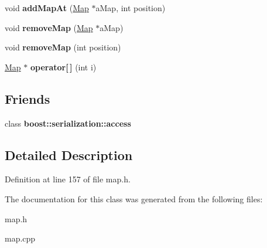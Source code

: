 \begin{DoxyCompactItemize}
void {\bfseries add\+Map\+At} (\hyperlink{class_map}{Map} $\ast$a\+Map, int position)
\item 
\hypertarget{class_campain_abbe7186905f7b9f8e0772af60c78e6f1}{}\label{class_campain_abbe7186905f7b9f8e0772af60c78e6f1} 
void {\bfseries remove\+Map} (\hyperlink{class_map}{Map} $\ast$a\+Map)
\item 
\hypertarget{class_campain_ac6a634b0149cbab03905e352d575e807}{}\label{class_campain_ac6a634b0149cbab03905e352d575e807} 
void {\bfseries remove\+Map} (int position)
\item 
\hypertarget{class_campain_a9e2011c5dc482e3e921d5141ea316cfc}{}\label{class_campain_a9e2011c5dc482e3e921d5141ea316cfc} 
\hyperlink{class_map}{Map} $\ast$ {\bfseries operator\mbox{[}$\,$\mbox{]}} (int i)
\end{DoxyCompactItemize}
\subsection*{Friends}
\begin{DoxyCompactItemize}
\item 
\hypertarget{class_campain_ac98d07dd8f7b70e16ccb9a01abf56b9c}{}\label{class_campain_ac98d07dd8f7b70e16ccb9a01abf56b9c} 
class {\bfseries boost\+::serialization\+::access}
\end{DoxyCompactItemize}


\subsection{Detailed Description}


Definition at line 157 of file map.\+h.



The documentation for this class was generated from the following files\+:\begin{DoxyCompactItemize}
\item 
map.\+h\item 
map.\+cpp\end{DoxyCompactItemize}
